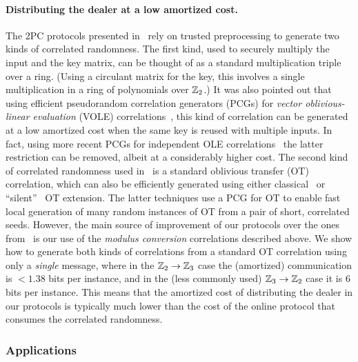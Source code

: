 \paragraph{Distributing the dealer at a low amortized cost.} The 2PC protocols presented in~\cite{boneh2018-darkmatter} rely on trusted preprocessing to generate two kinds of correlated randomness. The first kind, used to securely multiply the input and the key matrix, can be thought of as a standard multiplication triple over a ring. (Using a circulant matrix for the key, this involves a single multiplication in a ring of polynomials over $\mathbb{Z}_2$.)  It was also pointed out that using efficient pseudorandom correlation generators (PCGs) for {\em vector oblivious-linear evaluation} (VOLE) correlations~\cite{BCGI18,BCGIKRS19,SchoppmannGR019}, this kind of correlation can be generated at a low amortized cost when the same key is reused with multiple inputs. In fact, using more recent PCGs for independent OLE correlations~\cite{boyle2020-lpn-pcg} the latter restriction can be removed, albeit at a considerably higher cost.  The second kind of correlated randomness used in~\cite{boneh2018-darkmatter} is a standard oblivious transfer (OT) correlation, which can also be efficiently generated using either classical~\cite{IKNP} or ``silent''~\cite{BCGIKRS19,yang2020-ferret} OT extension. The latter techniques use a PCG for OT to enable fast local generation of many random instances of OT from a pair of short, correlated seeds.
However, the main source of improvement of our protocols over the ones from~\cite{boneh2018-darkmatter}  is our use of the {\em modulus conversion} correlations described above. We show how to generate both kinds of correlations from a standard OT correlation using only a {\em single} message, where in the $\mathbb{Z}_2 \to \mathbb{Z}_3$ case the (amortized) communication is $<1.38$ bits per instance, and in the (less commonly used) $\mathbb{Z}_3 \to \mathbb{Z}_2$ case it is $6$ bits per instance. This means that the amortized cost of distributing the dealer in our protocols is typically much lower than the cost of the online protocol that consumes the correlated randomness.


\subsubsection{Applications}


